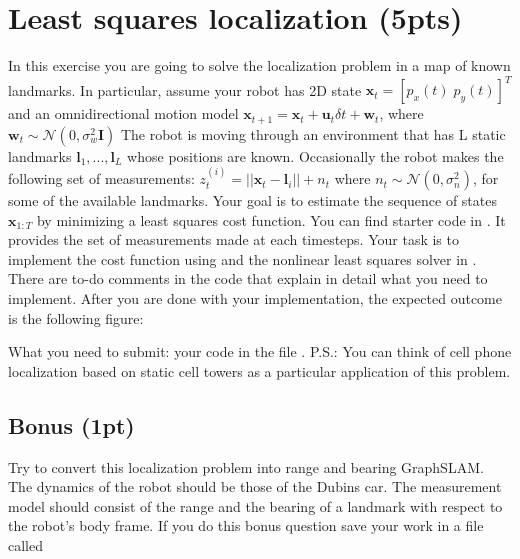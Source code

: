 \documentclass[a4paper,10pt]{article}
\begin{document}
\section{Least squares localization (5pts)}
In this exercise you are going to solve the localization problem in a map of known landmarks. In particular, assume your robot
has 2D state $\textbf{x}_t=[p_x(t) \; p_y(t)]^T$ and an omnidirectional motion model $\textbf{x}_{t+1}=\textbf{x}_t + \textbf{u}_t\delta t + \textbf{w}_t$, where $\textbf{w}_t \sim \mathcal{N}(0, \sigma_w^2\textbf{I})$
The robot is moving through an environment that has L static landmarks $\textbf{l}_1, ..., \textbf{l}_L$ whose positions are known.
Occasionally the robot makes the following set of measurements: $z_t^{(i)}=||\textbf{x}_t-\textbf{l}_i||+n_t$ where $n_t \sim \mathcal{N}(0, \sigma_n^2)$, for some of the available landmarks.
Your goal is to estimate the sequence of states $\textbf{x}_{1:T}$ by minimizing a least squares cost function. 
\newline
\newline
\noindent You can find starter code in . It provides the set of measurements made at each timesteps. Your task is to implement the cost 
function using  and the nonlinear least squares solver in . There are to-do comments in the code that explain in detail what you need to implement. 
After you are done with your implementation, the expected outcome is the following figure:

\noindent What you need to submit: your code in the file .
\newline
\newline
P.S.: You can think of cell phone localization based on static cell towers as a particular application of this problem.  

\subsection{Bonus (1pt)}
Try to convert this localization problem into range and bearing GraphSLAM. The dynamics of the robot should be those of the Dubins car. 
The measurement model should consist of the range and the bearing of a landmark with respect to the robot's body frame. If you do
this bonus question save your work in a file called  
\end{document}
